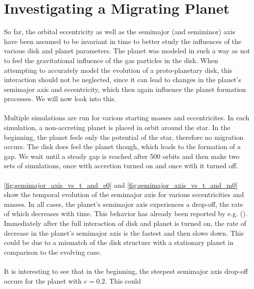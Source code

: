     \section{Investigating a Migrating Planet}
      So far, the orbital eccentricity as well as the semimajor (and semiminor) 
      axis have been assumed to be invariant in time to better study the 
      influences of the various disk and planet parameters. The 
      planet was modeled in such a way as not to feel the gravitational 
      influence of the gas particles in the disk.
      When attempting to accurately model the evolution of a proto-planetary 
      disk, this interaction should not be neglected, since it can lead to 
      changes in the planet's semimajor axis and eccentricity, which then 
      again influence the planet formation processes. We will now look into 
      this. \\
      \\
      Multiple simulations are run for various starting masses and 
      eccentricites. In each simulation, a non-accreting planet is placed in 
      orbit around the star. In the beginning, the planet feels only the 
      potential of the star, therefore no migration occurs. The disk does feel 
      the planet though, which leads to the formation of a gap. We wait until 
      a steady gap is 
      reached after 500 orbits and then make two sets of simulations, once 
      with accretion turned on and once with it turned off. \\
      \\
      \autoref{fig:semimajor_axis_vs_t_and_e0} 
      and 
      \autoref{fig:semimajor_axis_vs_t_and_m0} 
      show the temporal evolution of 
      the semimajor axis for various eccentricities and masses. In all cases,
      the planet's semimajor axis experiences a drop-off, the rate of which 
      decreases with time. This behavior has already been reported by e.g. 
      \citeauthor{Kley_2015} (\citeyear{Kley_2015}). Immediately after 
      the full interaction of disk and planet is turned on, the rate of 
      decrease in the planet's semimajor axis is the fastest and then slows
      down. This could be due to a mismatch of the disk structure with a 
      stationary planet in comparison to the evolving case. \\
      \\
      It is interesting to see that in the beginning, the steepest 
      semimajor axis drop-off occurs for the planet with $e=0.2$. This could 
